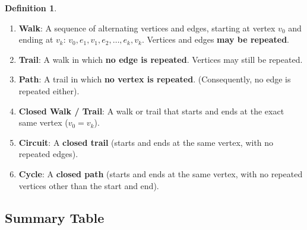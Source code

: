 \documentclass[
]{book}
\providecommand{\tightlist}{%
  \setlength{\itemsep}{0pt}\setlength{\parskip}{0pt}}
\theoremstyle{definition}
\newtheorem{definition}{Definition}[chapter]
\theoremstyle{definition}
\theoremstyle{definition}
\theoremstyle{definition}
\theoremstyle{remark}
\begin{document}
\begin{definition}
\protect\hypertarget{def:unnamed-chunk-11}{}\label{def:unnamed-chunk-11}\leavevmode

\begin{enumerate}
\def\labelenumi{\arabic{enumi}.}
\tightlist
\item
  \textbf{Walk}: A sequence of alternating vertices and edges, starting at vertex \(v_0\) and ending at \(v_k\): \(v_0, e_1, v_1, e_2, \dots, e_k, v_k\). Vertices and edges \textbf{may be repeated}.
\item
  \textbf{Trail}: A walk in which \textbf{no edge is repeated}. Vertices may still be repeated.
\item
  \textbf{Path}: A trail in which \textbf{no vertex is repeated}. (Consequently, no edge is repeated either).
\item
  \textbf{Closed Walk / Trail}: A walk or trail that starts and ends at the exact same vertex (\(v_0 = v_k\)).
\item
  \textbf{Circuit}: A \textbf{closed trail} (starts and ends at the same vertex, with no repeated edges).
\item
  \textbf{Cycle}: A \textbf{closed path} (starts and ends at the same vertex, with no repeated vertices other than the start and end).
\end{enumerate}

\end{definition}

\subsection{Summary Table}\label{summary-table}
\end{document}
